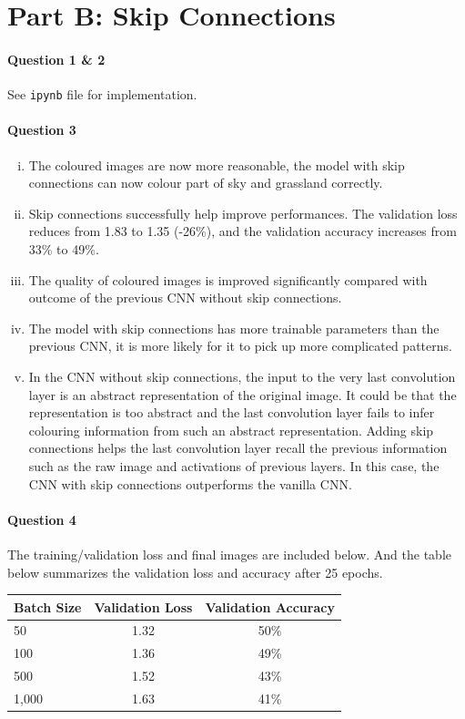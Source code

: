 \documentclass[12pt]{article}
\begin{document}
	\section{Part B: Skip Connections}
	\paragraph{Question 1 \& 2} See \texttt{ipynb} file for implementation.
	\paragraph{Question 3}
	\begin{enumerate}[(i)]
		\item The coloured images are now more reasonable, the model with skip connections can now colour part of sky and grassland correctly.
		\item Skip connections successfully help improve performances. The validation loss reduces from 1.83 to 1.35 (-26\%), and the validation accuracy increases from 33\% to 49\%.
		\item The quality of coloured images is improved significantly compared with outcome of the previous CNN without skip connections.
		\item The model with skip connections has more trainable parameters than the previous CNN, it is more likely for it to pick up more complicated patterns.
		\item In the CNN without skip connections, the input to the very last convolution layer is an abstract representation of the original image. It could be that the representation is too abstract and the last convolution layer fails to infer colouring information from such an abstract representation. Adding skip connections helps the last convolution layer recall the previous information such as the raw image and activations of previous layers. In this case, the CNN with skip connections outperforms the vanilla CNN.
	\end{enumerate}
	\paragraph{Question 4} The training/validation loss and final images are included below. And the table below summarizes the validation loss and accuracy after 25 epochs.
	
	\begin{table}[H]
		\centering
		\begin{tabular}{l|c c}
			\toprule
			Batch Size & Validation Loss & Validation Accuracy \\
			\midrule
			50 & 1.32 & 50\% \\
			100 & 1.36 & 49\% \\
			500 & 1.52 & 43\% \\
			1,000 & 1.63 & 41\%
		\end{tabular}
	\end{table}
	
\end{document}
